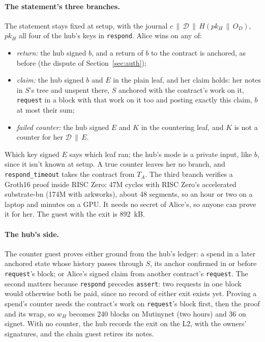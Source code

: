 \documentclass[11pt]{article}
\newcommand{\tx}[1]{\texttt{#1}}
\begin{document}
\paragraph{The statement's three branches.} The statement stays fixed at
setup, with the journal $c \,\|\, \mathcal{D} \,\|\, H(pk_H \,\|\, O_D)$,
$pk_H$ all four of the hub's keys in \tx{respond}. Alice wins on any of:
\begin{itemize}[leftmargin=1.5em]
\item \emph{return:} the hub signed $b$, and a return of $b$ to the
  contract is anchored, as before (the dispute of
  Section~\ref{sec:auth});
\item \emph{claim:} the hub signed $b$ and $E$ in the plain leaf, and her
  claim holds: her notes in $S$'s tree and unspent there, $S$ anchored
  with the contract's work on it, \tx{request} in a block with that work
  on it too and posting exactly this claim, $b$ at most their sum;
\item \emph{failed counter:} the hub signed $E$ and $K$ in the countering
  leaf, and $K$ is not a counter for her $\mathcal{D} \,\|\, E$.
\end{itemize}
Which key signed $E$ says which leaf ran; the hub's mode is a private
input, like $b$, since it isn't known at setup. A true counter leaves
her no branch, and \tx{respond\_timeout} takes the contract from $T_A$.
The third branch verifies a Groth16 proof inside RISC Zero: 47M cycles
with RISC Zero's accelerated substrate-bn (174M with arkworks), about
48 segments, so an hour or two on a laptop and minutes on a GPU. It needs
no secret of Alice's, so anyone can prove it for her. The guest with the
exit is 892~kB.

\paragraph{The hub's side.} The counter guest proves either ground
from the hub's ledger: a spend in a later anchored state whose history
passes through $S$, its anchor confirmed in or before \tx{request}'s
block; or Alice's signed claim from another contract's \tx{request}.
The second matters because \tx{respond} precedes \tx{assert}: two
requests in one block would otherwise both be paid, since no record of
either exit exists yet. Proving a spend's counter needs the contract's
work on \tx{request}'s block first, then the proof and its wrap, so
$w_H$ becomes 240 blocks on Mutinynet (two hours) and 36 on signet. With
no counter, the hub records the exit on the L2, with the owners'
signatures, and the chain guest retires its notes.
\end{document}
